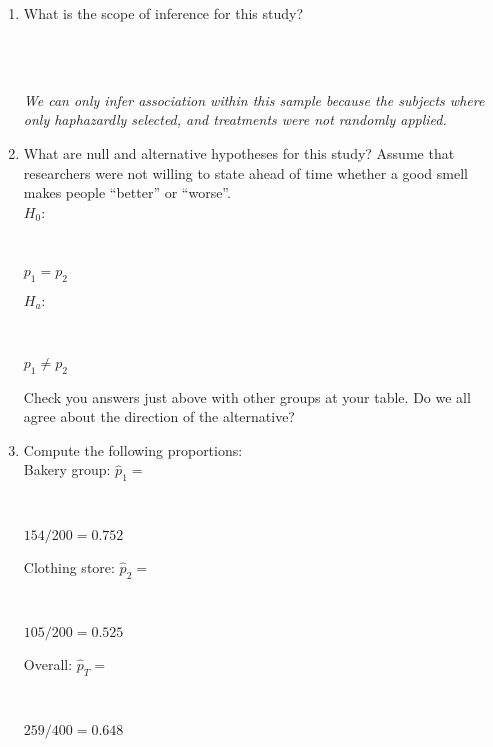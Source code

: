 \begin{enumerate}
\begin{key}
\end{key}
   \item  What is the scope of inference for this study? 
\begin{students}
 \vspace{1cm}\\
\end{students}
\begin{key}
 \\ {\it  We can only infer association within this sample because the
   subjects where only haphazardly selected, and treatments were not
   randomly applied.}
\end{key}

\item \label{Bake-hypotheses}What are null and alternative hypotheses
  for this study? Assume that researchers were not willing to state
  ahead of time whether a good smell makes people ``better'' or ``worse''. \\
  $H_0:$\
\begin{students}
 \vspace{1cm}\\
\end{students}
\begin{key}
 $p_1 = p_2$ \\
\end{key}
   $H_a: $
\begin{students}
     \vspace{1cm}\\
\end{students}
\begin{key}
   $ p_1 \neq p_2$ \\
\end{key}   

     Check you  answers just above with other groups at your table.
     Do we all agree about the direction of the alternative?  
\item Compute the following proportions:\\
    Bakery group:  $\widehat{p}_1 = $
\begin{students}
 \vspace{1cm}\\
\end{students}
\begin{key}
  $154/200 = 0.752$ \\
\end{key}
Clothing store: $\widehat{p}_2 = $
\begin{students}
 \vspace{1cm}\\
\end{students}
\begin{key}
  $105/200 = 0.525$ \\
\end{key}
    Overall: $\widehat{p}_T = $
\begin{students}
 \vspace{1cm}\\
\end{students}
\begin{key}
  $259/400 = 0.648$ \\
\end{key}


\end{enumerate}
